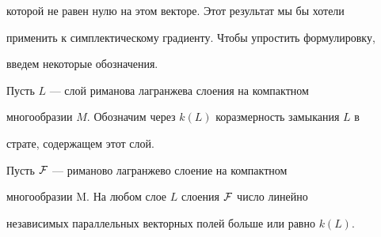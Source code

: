 которой не равен нулю на этом векторе. Этот результат мы бы хотели


применить к симплектическому градиенту. Чтобы упростить формулировку,


введем некоторые обозначения.





Пусть $L$ --- слой риманова лагранжева слоения на компактном


многообразии $M$. Обозначим через $k(L)$ коразмерность замыкания $L$ в


страте, содержащем этот слой.





\begin{thm}


Пусть $\cal F$ --- риманово лагранжево слоение на компактном


многообразии M. На любом слое $L$ слоения $\cal F$ число линейно


независимых параллельных векторных полей больше или равно $k(L)$.


\end{thm}








